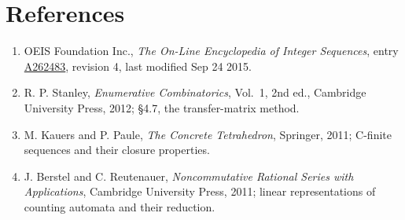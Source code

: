 \documentclass[11pt]{article}
\theoremstyle{definition}
\begin{document}
\section{References}

\begin{enumerate}

\item OEIS Foundation Inc., \emph{The On-Line Encyclopedia of Integer Sequences}, entry \href{https://oeis.org/A262483}{A262483}, revision 4, last modified Sep 24 2015.

\item R. P. Stanley, \emph{Enumerative Combinatorics}, Vol.~1, 2nd ed., Cambridge University Press, 2012; \S4.7, the transfer-matrix method.

\item M. Kauers and P. Paule, \emph{The Concrete Tetrahedron}, Springer, 2011; C-finite sequences and their closure properties.

\item J. Berstel and C. Reutenauer, \emph{Noncommutative Rational Series with Applications}, Cambridge University Press, 2011; linear representations of counting automata and their reduction.

\end{enumerate}
\end{document}
